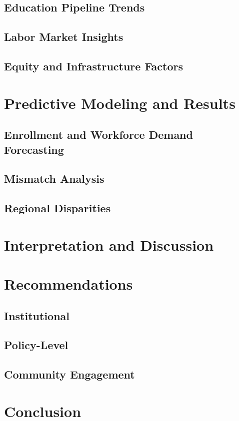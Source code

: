 \documentclass[runningheads]{llncs}
\begin{document}
\subsection{Education Pipeline Trends}
\subsection{Labor Market Insights}
\subsection{Equity and Infrastructure Factors}

\section{Predictive Modeling and Results}
\subsection{Enrollment and Workforce Demand Forecasting}
\subsection{Mismatch Analysis}
\subsection{Regional Disparities}

\section{Interpretation and Discussion}

\section{Recommendations}
\subsection{Institutional}
\subsection{Policy-Level}
\subsection{Community Engagement}

\section{Conclusion}
\end{document}
